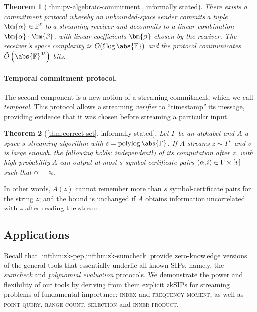 \documentclass[10pt,a4paper]{article}
\newif\iflipics\lipicsfalse
\newtheorem{theorem}{Theorem}[section]
\theoremstyle{definition}
\newcommand{\zksip}{\textrm{zkSIP}}
\newcommand{\field}{\mathbb{F}}
\newcommand{\polylog}{\operatorname{polylog}}
\newcommand{\indexproblem}{\normalfont\textsc{index}\xspace}
\newcommand{\frequencymoment}{\normalfont\textsc{frequency-moment}\xspace}
\newcommand{\pointquery}{\normalfont\textsc{point-query}\xspace}
\newcommand{\rangecount}{\normalfont\textsc{range-count}\xspace}
\newcommand{\selection}{\normalfont\textsc{selection}\xspace}
\newcommand{\innerproductproblem}{\normalfont\textsc{inner-product}\xspace}
\newcommand{\vcommitlength}{v}
\newcommand{\vcommitstring}{z}
\newcommand{\evaluationpoint}{\bm{\fe2}}
\newcommand{\alphabet}{\Gamma}
\def\symbol#1{
    \ifnum#1=1
        \alpha
    \else
    \ifnum#1=2
        \beta
    \else
    \ifnum#1=3
        \gamma
    \fi\fi\fi
}
\def\fe#1{
    \ifnum#1=1
        \alpha
    \else
    \ifnum#1=2
        \beta
    \else
    \ifnum#1=3
        \gamma
    \fi\fi\fi
}
\begin{document}
\begin{theorem}[\cref{thm:pv-algebraic-commitment}, informally stated]
    \label{infthm:pv-commitment}
    There exists a commitment protocol whereby an unbounded-space sender commits a tuple $\bm{\fe1} \in \field^\ell$ to a streaming receiver and decommits to a linear combination $\bm{\fe1} \cdot \evaluationpoint$, with linear coefficients $\bm{\fe2}$ chosen by the receiver. The receiver's space complexity is $O (\ell \log \abs{\field})$ and the protocol communicates $\tilde O\left(\abs{\field}^{3\ell}\right)$ bits.
\end{theorem}

\paragraph*{Temporal commitment protocol\iflipics\else.\fi}
The second component is a new notion of a streaming commitment, which we call \emph{temporal}.
This protocol allows a streaming \emph{verifier} to ``timestamp'' its message, providing evidence that it was chosen before streaming a particular input.

\begin{theorem}[\cref{thm:correct-set}, informally stated]
    \label{infthm:correct-set}
    Let $\alphabet$ be an alphabet and $A$ a space-$s$ streaming algorithm with $s = \polylog \abs{\alphabet}$. If $A$ streams $z \sim \alphabet^\vcommitlength$ and $\vcommitlength$ is large enough, the following holds: \emph{independently of its computation} after $\vcommitstring$, with high probability $A$ can output at most $s$ symbol-certificate pairs $(\symbol1, i) \in \alphabet \times [\vcommitlength]$ such that $\symbol1 = \vcommitstring_i$.
\end{theorem}

In other words, $A(\vcommitstring)$ cannot remember more than $s$ symbol-certificate pairs for the string $\vcommitstring$; and the bound is unchanged if $A$ obtains information uncorrelated with $\vcommitstring$ after reading the stream.

\subsection{Applications}
\label{sec:applications}

Recall that \cref{infthm:zk-pep,infthm:zk-sumcheck} provide zero-knowledge versions of the general tools that essentially underlie all known SIPs, namely, the \emph{sumcheck} and \emph{polynomial evaluation} protocols. We demonstrate the power and flexibility of our tools by deriving from them explicit \zksip{}s for streaming problems of fundamental importance: \indexproblem and \frequencymoment, as well as \pointquery, \rangecount, \selection and \innerproductproblem.
\end{document}
